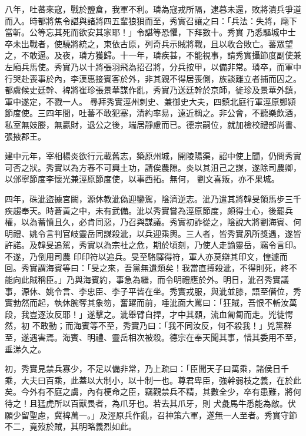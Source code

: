\begin{pinyinscope}
 八年，吐蕃來寇，戰於鹽倉，我軍不利。璘為寇戎所隔，逮暮未還，敗將潰兵爭道而入。時都將焦令諶與諸將四五輩狼狽而至，秀實召讓之曰：「兵法：失將，麾下當斬。公等忘其死而欲安其家耶！」令諶等恐懼，下拜數十。秀實
 乃悉驅城中士卒未出戰者，使驍將統之，東依古原，列奇兵示賊將戰，且以收合敗亡。蕃眾望之，不敢逼。及夜，璘方獲歸。十一年，璘疾甚，不能視事，請秀實攝節度副使兼左廂兵馬使。秀實乃以十將張羽飛為招召將，分兵按甲，以備非常。璘卒，而軍中行哭赴喪事於內，李漢惠接賓客於外，非其親不得居喪側，族談離立者捕而囚之。都虞候史廷幹、裨將崔珍張景華謀作亂，秀實乃送廷幹於京師，徙珍及景華外鎮，軍中遂定，不戮一人。
 尋拜秀實涇州刺史、兼御史大夫，四鎮北庭行軍涇原鄭潁節度使。三四年間，吐蕃不敢犯塞，清約率易，遠近稱之。非公會，不聽樂飲酒，私室無妓媵，無贏財，退公之後，端居靜慮而已。德宗嗣位，就加檢校禮部尚書、張掖郡王。



 建中元年，宰相楊炎欲行元載舊志，築原州城，開陵陽渠，詔中使上聞，仍問秀實可否之狀。秀實以為方春不可興土功，請俟農隙。炎以其沮己之謀，遂除司農卿，以邠寧節度李懷光兼涇原節度使，以事西拓。無何，
 劉文喜叛，亦不果城。



 四年，硃泚盜據宮闕，源休教泚偽迎鑾駕，陰濟逆志。泚乃遣其將韓旻領馬步三千疾趨奉天。時蒼黃之中，未有武備。泚以秀實嘗為涇原節度，頗得士心，後罷兵權，以為蓄憤且久，必肯同惡，乃召與謀議。秀實初詐從之，陰說大將劉海賓、何明禮、姚令言判官岐靈岳同謀殺泚，以兵迎乘輿。三人者，皆秀實夙所獎遇，遂皆許諾。及韓旻追駕，秀實以為宗社之危，期於頃刻，乃使人走諭靈岳，竊令言印。不遂，乃倒用司農
 印印符以追兵。旻至駱驛得符，軍人亦莫辯其印文，惶遽而回。秀實謂海賓等曰：「旻之來，吾黨無遺類矣！我當直搏殺泚，不得則死，終不能向此賊稱臣。」乃與海賓約，事急為繼，而令明禮應於外。明日，泚召秀實議事，源休、姚令言、李忠臣、李子平皆在坐。秀實戎服，與泚並膝，語至僭位，秀實勃然而起，執休腕奪其象笏，奮躍而前，唾泚面大罵曰：「狂賊，吾恨不斬汝萬段，我豈逐汝反耶！」遂擊之。泚舉臂自捍，才中其顙，流血匍匐而走。兇徒愕然，初
 不敢動；而海賓等不至，秀實乃曰：「我不同汝反，何不殺我！」兇黨群至，遂遇害焉。海賓、明禮、靈岳相次被殺。德宗在奉天聞其事，惜其委用不至，垂涕久之。



 初，秀實見禁兵寡少，不足以備非常，乃上疏曰：「臣聞天子曰萬乘，諸侯日千乘，大夫曰百乘，此蓋以大制小，以十制一也。尊君卑臣，強幹弱枝之義，在於此矣。今外有不庭之虜，內有梗命之臣，竊觀禁兵不精，其數全少，卒有患難，將何待之！且猛虎所以百獸畏者，為爪牙也。若去其爪牙，則
 犬彘馬牛悉能為敵。伏願少留聖慮，冀裨萬一。」及涇原兵作亂，召神策六軍，遂無一人至者。秀實守節不二，竟歿於賊，其明略義烈如此。




\end{pinyinscope}
